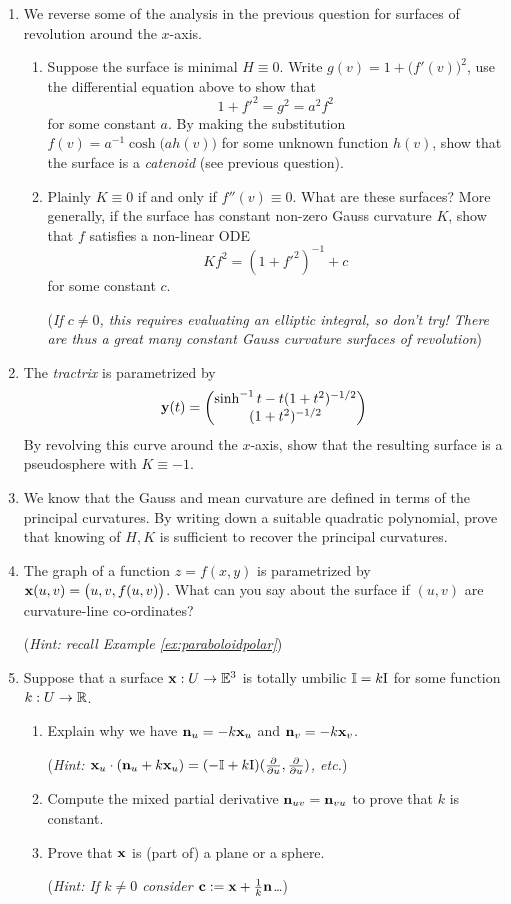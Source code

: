 \begin{exercises}{}{}
\begin{enumerate}
	\item We reverse some of the analysis in the previous question for surfaces of revolution around the $x$-axis.
	\begin{enumerate}
	  \item Suppose the surface is minimal $H\equiv 0$. Write  $g(v)=1+\bigl(f'(v)\bigr)^2$, use the differential equation above to show that
	  \[1+f'^2=g^2=a^2f^2\]
	  for some constant $a$. By making the substitution $f(v)=a^{-1}\cosh\bigl(ah(v)\bigr)$ for some unknown function $h(v)$, show that the surface is a \emph{catenoid} (see previous question).
	  \item Plainly $K\equiv 0$ if and only if $f''(v)\equiv 0$. What are these surfaces? More generally, if the surface has constant non-zero Gauss curvature $K$, show that $f$ satisfies a non-linear ODE
	  \[Kf^2=(1+f'^2)^{-1}+c\]
	  for some constant $c$.\par
	  (\emph{If $c\neq 0$, this requires evaluating an elliptic integral, so don't try! There are thus a great many constant Gauss curvature surfaces of revolution})
	\end{enumerate}
	
	
	\item The \emph{tractrix} is parametrized by
	\[{\mathbf{y}}(t)=\begin{pmatrix}\sinh^{-1}t-t(1+t^2)^{-1/2}\\(1+t^2)^{-1/2}\end{pmatrix}\]
	By revolving this curve around the $x$-axis, show that the resulting surface is a pseudosphere with $K\equiv -1$.
	
	

  \item We know that the Gauss and mean curvature are defined in terms of the principal curvatures. By writing down a suitable quadratic polynomial, prove that knowing of $H,K$ is sufficient to recover the principal curvatures.
	
	  
  \item The graph of a function $z=f(x,y)$ is parametrized by ${\mathbf{x}}(u,v)=\bigl(u,v,f(u,v)\bigr)$. What can you say about the surface if $(u,v)$ are curvature-line co-ordinates?\par
  (\emph{Hint: recall Example \ref{ex:paraboloidpolar}})


	\item\label{exs:totallyumbilic} Suppose that a surface ${\mathbf{x}}:U\to\mathbb{E}^3$ is totally umbilic $\mathbb{I}=k\mathrm{I}$ for some function $k:U\to\mathbb{R}$.
	\begin{enumerate}
	  \item Explain why we have ${\mathbf{n}}_u=-k{\mathbf{x}}_u$ and ${\mathbf{n}}_v=-k{\mathbf{x}}_v$.\par
	  (\emph{Hint: ${\mathbf{x}}_u\cdot({\mathbf{n}}_u+k{\mathbf{x}}_u)=(-\mathbb{I}+k\mathrm{I})(\frac{\partial }{\partial u},\frac{\partial }{\partial u})$, etc.})
	  \item Compute the mixed partial derivative ${\mathbf{n}}_{uv}={\mathbf{n}}_{vu}$ to prove that $k$ is constant.
	  \item Prove that ${\mathbf{x}}$ is (part of) a plane or a sphere.\par
	  (\emph{Hint: If $k\neq 0$ consider ${\mathbf{c}}:={\mathbf{x}}+\frac 1k{\mathbf{n}}$\ldots})
	\end{enumerate}



\end{enumerate}
\end{exercises}

